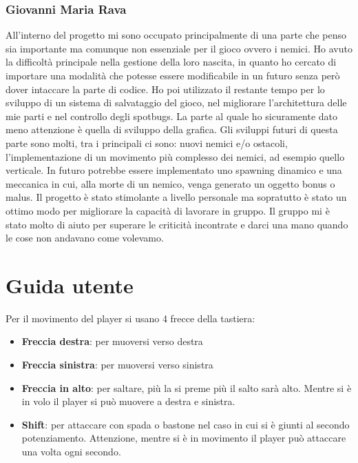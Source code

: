 \documentclass[a4paper,12pt]{report}
\begin{document}
\subsection{Giovanni Maria Rava}
All'interno del progetto mi sono occupato principalmente di una parte che penso sia importante ma comunque non essenziale per il 
gioco ovvero i nemici. Ho avuto la difficoltà principale nella gestione della loro nascita, in quanto ho cercato di importare una 
modalità che potesse essere modificabile in un futuro senza però dover intaccare la parte di codice. Ho poi utilizzato il restante
tempo per lo sviluppo di un sistema di salvataggio del gioco, nel migliorare l'architettura delle mie parti e nel controllo degli 
spotbugs. La parte al quale ho sicuramente dato meno attenzione è quella di sviluppo della grafica. Gli sviluppi futuri di questa 
parte sono molti, tra i principali  ci sono: nuovi nemici e/o ostacoli, l'implementazione di un movimento più complesso dei nemici,
ad esempio quello verticale. In futuro potrebbe essere implementato uno spawning dinamico e una meccanica in cui, alla morte di un
nemico, venga generato un oggetto bonus o malus.
Il progetto è stato stimolante a livello personale ma sopratutto è stato un ottimo modo per migliorare la capacità di lavorare in 
gruppo. Il gruppo mi è stato molto di aiuto per superare le criticità incontrate e darci una mano quando le cose non andavano come 
volevamo.
\appendix
\chapter{Guida utente}
Per il movimento del player si usano 4 frecce della tastiera:
\begin{itemize}
    \item \textbf{Freccia destra}: per muoversi verso destra
    \item \textbf{Freccia sinistra}: per muoversi verso sinistra
    \item \textbf{Freccia in alto}: per saltare, più la si preme più il salto sarà alto.
    Mentre si è in volo il player si può muovere a destra e sinistra.
    \item \textbf{Shift}: per attaccare con spada o bastone nel caso in cui si è giunti al secondo potenziamento.
    Attenzione, mentre si è in movimento il player può attaccare una volta ogni secondo.
\end{itemize}
\end{document}
